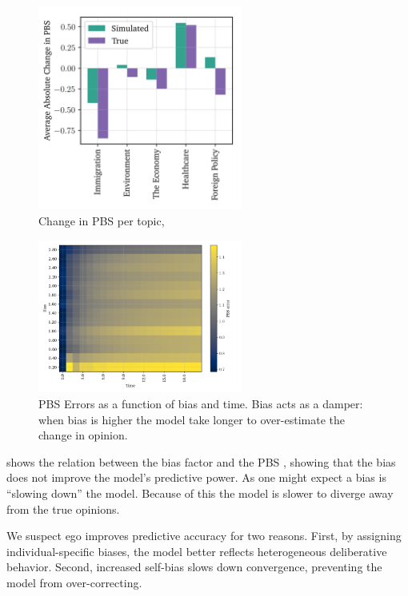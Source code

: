 \begin{figure}[ht]
	\begin{center}
		\includegraphics[width=0.6\textwidth]{Figures/per_topic_change.png}
	\end{center}
	\caption{Change in PBS per topic, }\label{fig:per_topic}
\end{figure}

\begin{figure}[ht]
	\centering

	\includegraphics[width=0.6\textwidth]{Figures/bias_time_imshow.png}
	\hspace{1em}
	\caption{PBS Errors as a function of bias and time. Bias acts as a damper: when bias is higher the model take longer to over-estimate the change in opinion.}
	\label{fig:bias_slowdown}
\end{figure}

 shows the relation between the bias factor and the PBS
, showing that the bias does not improve the model's predictive power. As
one might expect a bias is ``slowing down'' the model. Because of this the
model is slower to diverge away from the true opinions.

We suspect ego improves predictive accuracy for two reasons. First, by
assigning individual-specific biases, the model better reflects heterogeneous
deliberative behavior. Second, increased self-bias slows down convergence,
preventing the model from over-correcting.

